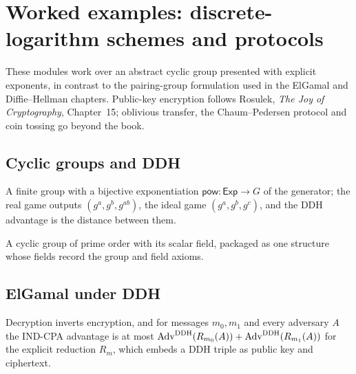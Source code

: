 \chapter{Worked examples: discrete-logarithm schemes and protocols}

These modules work over an abstract cyclic group presented with explicit
exponents, in contrast to the pairing-group formulation used in the ElGamal and
Diffie--Hellman chapters. Public-key encryption
follows Rosulek, \emph{The Joy of Cryptography}, Chapter~15; oblivious transfer,
the Chaum--Pedersen protocol and coin tossing go beyond the book.

\section{Cyclic groups and DDH}

\begin{definition}
  \label{def:cyclicgroup-ddh}
  \leanok
  A finite group with a bijective exponentiation $\mathsf{pow} : \mathsf{Exp} \to G$
  of the generator; the real game outputs $(g^a, g^b, g^{ab})$, the ideal game
  $(g^a, g^b, g^c)$, and the DDH advantage is the distance between them.
\end{definition}

\begin{definition}
  \label{def:groupparam}
  \leanok
  A cyclic group of prime order with its scalar field, packaged as one structure
  whose fields record the group and field axioms.
\end{definition}

\section{ElGamal under DDH}

\begin{theorem}
  \label{thm:elgamal-cyclic}
  \leanok
  Decryption inverts encryption, and for messages $m_0, m_1$ and every adversary
  $A$ the IND-CPA advantage is at most
  $\operatorname{Adv}^{\mathrm{DDH}}(R_{m_0}(A)) + \operatorname{Adv}^{\mathrm{DDH}}(R_{m_1}(A))$ for the
  explicit reduction $R_m$, which embeds a DDH triple as public key and
  ciphertext.
\end{theorem}

